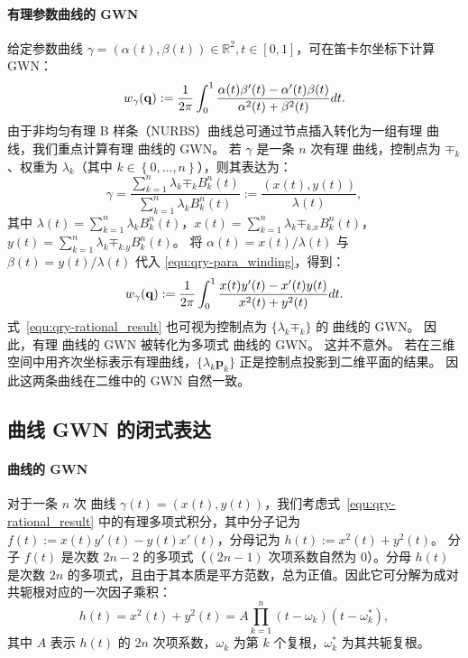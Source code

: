 \paragraph{有理参数曲线的 GWN}
给定参数曲线 $\gamma = (\alpha(t),\beta(t))\in \mathbb{R}^2, t \in [0,1]$，可在笛卡尔坐标下计算 GWN：
\begin{equation}\label{equ:qry-para_winding}
    w_\gamma(\mathbf{q}):=\frac{1}{2 \pi}\int_0^1 \frac{\alpha(t) \beta'(t) - \alpha'(t) \beta(t)}{\alpha^2(t)+\beta^2(t)} dt.
\end{equation}
%
由于非均匀有理 B 样条（NURBS）曲线总可通过节点插入转化为一组有理 \Bezier 曲线，我们重点计算有理 \Bezier 曲线的 GWN。
%
若 $\gamma$ 是一条 $n$ 次有理 \Bezier 曲线，控制点为 ${\mp}_k$、权重为 $\lambda_k$（其中 $k \in \left \{0,\dots,n\right\}$），则其表达为：
\begin{equation}
    \gamma = \frac{\sum_{k=1}^n \lambda_k \mp_k B_k^n(t)}{\sum_{k=1}^n \lambda_k B_k^n(t)}:=\frac{(x(t),y(t))}{\lambda(t)},
\end{equation}
其中 $\lambda(t)=\sum_{k=1}^n \lambda_k B_k^n(t)$，$x(t)=\sum_{k=1}^n \lambda_k \mp_{k.x} B_k^n(t)$，$y(t)=\sum_{k=1}^n \lambda_k \mp_{k.y} B_k^n(t)$。
将 $\alpha(t)=x(t)/\lambda(t)$ 与 $\beta(t)=y(t)/\lambda(t)$ 代入 \eqref{equ:qry-para_winding}，得到：
\begin{equation}\label{equ:qry-rational_result}
    w_{\gamma }(\mathbf{q}):=\frac{1}{2 \pi}\int_0^1 \frac{x(t)y'(t)-x'(t)y(t)}{x^2(t)+y^2(t)} dt.
\end{equation}
式~\eqref{equ:qry-rational_result} 也可视为控制点为 $\{\lambda_k \mp_k\}$ 的 \Bezier 曲线的 GWN。
因此，有理 \Bezier 曲线的 GWN 被转化为多项式 \Bezier 曲线的 GWN。
这并不意外。
若在三维空间中用齐次坐标表示有理曲线，$\{\lambda_k \mathbf{p}_k\}$ 正是控制点投影到二维平面的结果。
因此这两条曲线在二维中的 GWN 自然一致。


\subsection{\Bezier 曲线 GWN 的闭式表达}\label{sec:qry-general}
\paragraph{\Bezier 曲线的 GWN}
对于一条 $n$ 次 \Bezier 曲线 $\gamma(t)=(x(t),y(t))$，我们考虑式~\eqref{equ:qry-rational_result} 中的有理多项式积分，其中分子记为 $f(t):=x(t)y'(t)-y(t)x'(t)$，分母记为 $h(t):=x^2(t)+y^2(t)$。
分子 $f(t)$ 是次数 $2n-2$ 的多项式（$(2n-1)$ 次项系数自然为 0）。分母 $h(t)$ 是次数 $2n$ 的多项式，且由于其本质是平方范数，总为正值。因此它可分解为成对共轭根对应的一次因子乘积：
\begin{equation}
    h(t)=x^2(t)+y^2(t)=A \prod_{k=1}^n (t-\omega_k)(t-\omega_k^*),
\end{equation}
其中 $A$ 表示 $h(t)$ 的 $2n$ 次项系数，$\omega_k$ 为第 $k$ 个复根，$\omega_k^*$ 为其共轭复根。


